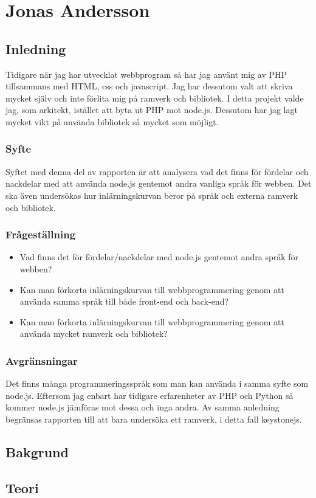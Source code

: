 \section{Jonas Andersson}
\subsection{Inledning} 
Tidigare när jag har utvecklat webbprogram så har jag använt mig av PHP tillsammans med HTML, css och javascript. Jag har dessutom valt att skriva mycket själv och inte förlita mig på ramverk och bibliotek. I detta projekt valde jag, som arkitekt, istället att byta ut PHP mot node.js. Dessutom har jag lagt mycket vikt på använda bibliotek så mycket som möjligt.
\subsubsection{Syfte}
Syftet med denna del av rapporten är att analysera vad det finns för fördelar och nackdelar med att använda node.js gentemot andra vanliga språk för webben. Det ska även undersökas hur inlärningskurvan beror på språk och externa ramverk och bibliotek.
\subsubsection{Frågeställning}
\begin{itemize}
  \item Vad finns det för fördelar/nackdelar med node.js gentemot andra språk för webben?
  \item Kan man förkorta inlärningskurvan till webbprogrammering genom att använda samma språk till både front-end och back-end?
  \item Kan man förkorta inlärningskurvan till webbprogrammering genom att använda mycket ramverk och bibliotek?
\end{itemize}
\subsubsection{Avgränsningar}
Det finns många programmeringsspråk som man kan använda i samma syfte som node.js. Eftersom jag enbart har tidigare erfarenheter av PHP och Python så kommer node.js jämföras mot dessa och inga andra. Av samma anledning begränsas rapporten till att bara undersöka ett ramverk, i detta fall keystonejs.
\subsection{Bakgrund}
\subsection{Teori}
